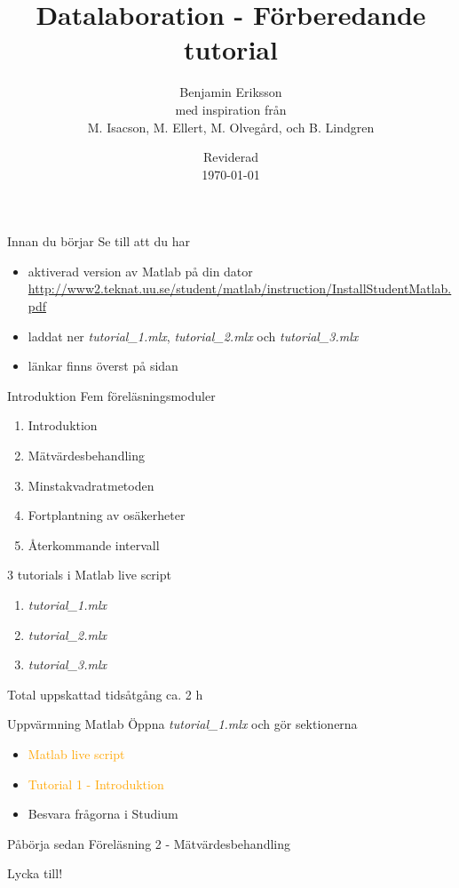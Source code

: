 \documentclass[9pt]{beamer}
\title{Datalaboration - Förberedande tutorial}
\author[benjamin.eriksson@physics.uu.se]{Benjamin Eriksson  \\ \tiny{med inspiration från} \\ \scriptsize{M. Isacson, M. Ellert, M. Olvegård, och B. Lindgren}}
\institute[Uppsala universitet]{{\small Avdelningen för tillämpad kärnfysik \\ Institutionen för fysik och astronomi} \\ \uulogo}
\date{{\small Reviderad}\\ \today}
\begin{document}
    \frame{\titlepage}

    \begin{frame}{Innan du börjar}
    Se till att du har
        \begin{itemize}
            \item aktiverad version av Matlab på din dator \\ \url{http://www2.teknat.uu.se/student/matlab/instruction/InstallStudentMatlab.pdf} 
            \item laddat ner \textit{tutorial\_1.mlx}, \textit{tutorial\_2.mlx} och \textit{tutorial\_3.mlx} 
            \item länkar finns överst på sidan
        \end{itemize}
    \end{frame}
    
    \begin{frame}{Introduktion}
        Fem föreläsningsmoduler
        \begin{enumerate}
            \item Introduktion
            \item Mätvärdesbehandling
            \item Minstakvadratmetoden
            \item Fortplantning av osäkerheter
            \item Återkommande intervall
        \end{enumerate}
        
        3 tutorials i Matlab live script 
        \begin{enumerate}
            \item \textit{tutorial\_1.mlx}
            \item \textit{tutorial\_2.mlx}
            \item \textit{tutorial\_3.mlx}
        \end{enumerate}
         Total uppskattad tidsåtgång ca. 2 h
    \end{frame}
    
    \begin{frame}{Uppvärmning Matlab}
        Öppna \textit{tutorial\_1.mlx} och gör sektionerna
        \begin{itemize}
            \item \textcolor{orange}{Matlab live script}
            \item \textcolor{orange}{Tutorial 1 - Introduktion}
            \item Besvara frågorna i Studium
        \end{itemize}
        \vspace{0.5cm}

        Påbörja sedan Föreläsning 2 - Mätvärdesbehandling
        
        \vspace{0.5cm}
        \begin{center}
            \large{Lycka till!}
        \end{center}
    \end{frame}
    
\end{document}
